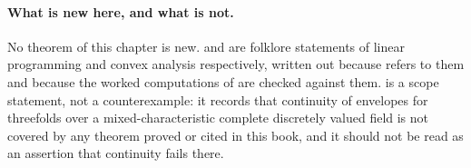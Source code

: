\paragraph{What is new here, and what is not.}
No theorem of this chapter is new.
 and
 are folklore statements of
linear programming and convex analysis respectively, written out because
 refers to them and because the
worked computations of  are checked against them.
 is a scope statement, not a counterexample: it
records that continuity of envelopes for threefolds over a
mixed-characteristic complete discretely valued field is not covered by any
theorem proved or cited in this book, and it should not be read as an
assertion that continuity fails there.
